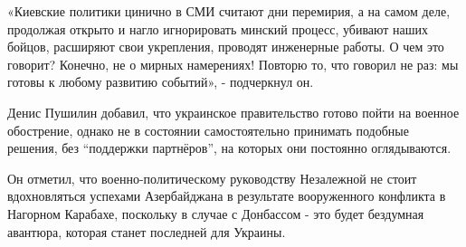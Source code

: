 «Киевские политики цинично в СМИ считают дни перемирия, а на самом деле,
продолжая открыто и нагло игнорировать минский процесс, убивают наших бойцов,
расширяют свои укрепления, проводят инженерные работы. О чем это говорит?
Конечно, не о мирных намерениях! Повторю то, что говорил не раз: мы готовы к
любому развитию событий», - подчеркнул он.

Денис Пушилин добавил, что украинское правительство готово пойти на военное
обострение, однако не в состоянии самостоятельно принимать подобные решения,
без \enquote{поддержки партнёров}, на которых они постоянно оглядываются.

Он отметил, что военно-политическому руководству Незалежной не стоит
вдохновляться успехами Азербайджана в результате вооруженного конфликта в
Нагорном Карабахе, поскольку в случае с Донбассом - это будет бездумная
авантюра, которая станет последней для Украины. 
